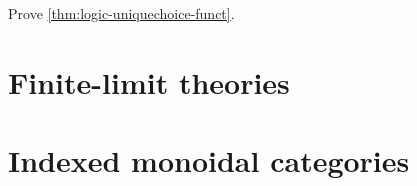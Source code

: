 \begin{ex}\label{ex:logic-uniquechoice-funct}
  Prove \cref{thm:logic-uniquechoice-funct}.
\end{ex}




\section{Finite-limit theories}
\label{sec:lex-theories}



\section{Indexed monoidal categories}
\label{sec:indexed-moncat}

